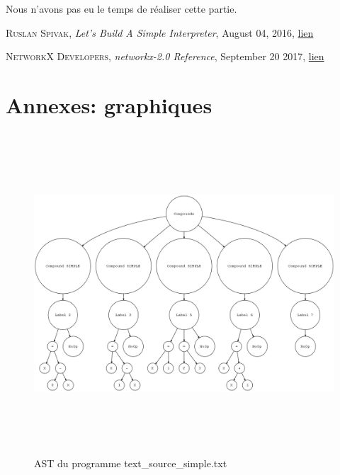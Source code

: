 \documentclass[a4paper]{article}
\begin{document}
Nous n'avons pas eu le temps de réaliser cette partie. 


\begin{thebibliography}{xx}
  \textsc{Ruslan Spivak}, \textit{Let’s Build A Simple Interpreter}, August 04, 2016, \href{https://ruslanspivak.com/lsbasi-part10/}{lien}
  
  \textsc{NetworkX Developers}, \textit{networkx-2.0 Reference}, September 20 2017, \href{https://networkx.github.io/documentation/networkx-2.0/}{lien}

\end{thebibliography}

\section*{Annexes: graphiques}

\begin{figure}[h!]
  \centering
  \includegraphics[width=12cm,height=12cm,keepaspectratio]{input/text_source_simple_ast.png}
  \caption{AST du programme text\_source\_simple.txt}
  \label{fig:ast1}
\end{figure}
\end{document}
